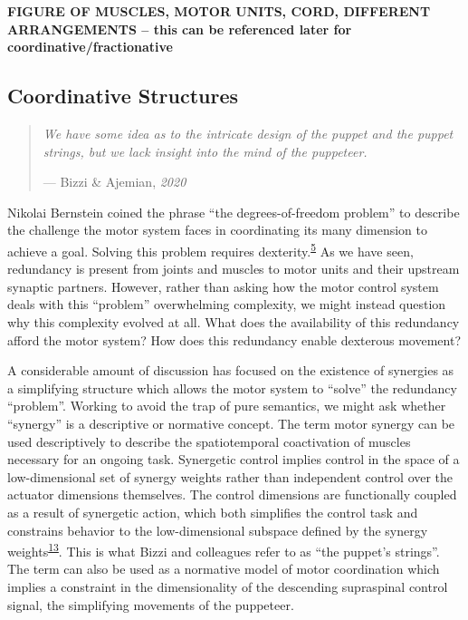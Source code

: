 \documentclass[
  a4paper,
]{article}
\begin{document}
\textbf{FIGURE OF MUSCLES, MOTOR UNITS, CORD, DIFFERENT ARRANGEMENTS --
this can be referenced later for coordinative/fractionative}

\hypertarget{coordinative-structures}{%
\subsection{Coordinative Structures}\label{coordinative-structures}}

\begin{quote}
\emph{We have some idea as to the intricate design of the puppet and the
puppet strings, but we lack insight into the mind of the puppeteer.}

--- Bizzi \& Ajemian, \emph{2020}
\end{quote}

Nikolai Bernstein coined the phrase ``the degrees-of-freedom problem''
to describe the challenge the motor system faces in coordinating its
many dimension to achieve a goal. Solving this problem requires
dexterity.\textsuperscript{\protect\hyperlink{ref-Bernstein1967}{5}} As
we have seen, redundancy is present from joints and muscles to motor
units and their upstream synaptic partners. However, rather than asking
how the motor control system deals with this ``problem'' overwhelming
complexity, we might instead question why this complexity evolved at
all. What does the availability of this redundancy afford the motor
system? How does this redundancy enable dexterous movement?

A considerable amount of discussion has focused on the existence of
synergies as a simplifying structure which allows the motor system to
``solve'' the redundancy ``problem''. Working to avoid the trap of pure
semantics, we might ask whether ``synergy'' is a descriptive or
normative concept. The term motor synergy can be used descriptively to
describe the spatiotemporal coactivation of muscles necessary for an
ongoing task. Synergetic control implies control in the space of a
low-dimensional set of synergy weights rather than independent control
over the actuator dimensions themselves. The control dimensions are
functionally coupled as a result of synergetic action, which both
simplifies the control task and constrains behavior to the
low-dimensional subspace defined by the synergy
weights\textsuperscript{\protect\hyperlink{ref-merelHierarchicalMotorControl2019}{13}}.
This is what Bizzi and colleagues refer to as ``the puppet's strings''.
The term can also be used as a normative model of motor coordination
which implies a constraint in the dimensionality of the descending
supraspinal control signal, the simplifying movements of the puppeteer.
\end{document}
